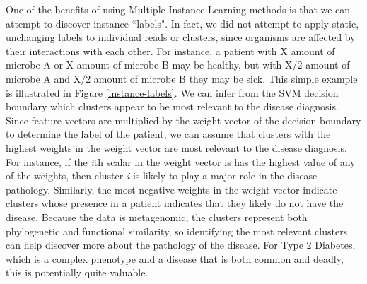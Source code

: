 One of the benefits of using Multiple Instance Learning methods is that we can attempt to discover instance ``labels". In fact, we did not attempt to apply static, unchanging labels to individual reads or clusters, since organisms are affected by their interactions with each other. For instance, a patient with X amount of microbe A or X amount of microbe B may be healthy, but with X/2 amount of microbe A and X/2 amount of microbe B they may be sick. This simple example is illustrated in Figure \ref{instance-labels}. We can infer from the SVM decision boundary which clusters appear to be most relevant to the disease diagnosis. Since feature vectors are multiplied by the weight vector of the decision boundary to determine the label of the patient, we can assume that clusters with the highest weights in the weight vector are most relevant to the disease diagnosis. For instance, if the \emph{i}th scalar in the weight vector is has the highest value of any of the weights, then cluster \emph{i} is likely to play a major role in the disease pathology. Similarly, the most negative weights in the weight vector indicate clusters whose presence in a patient indicates that they likely do not have the disease. Because the data is metagenomic, the clusters represent both phylogenetic and functional similarity, so identifying the most relevant clusters can help discover more about the pathology of the disease. For Type 2 Diabetes, which is a complex phenotype and a disease that is both common and deadly, this is potentially quite valuable.